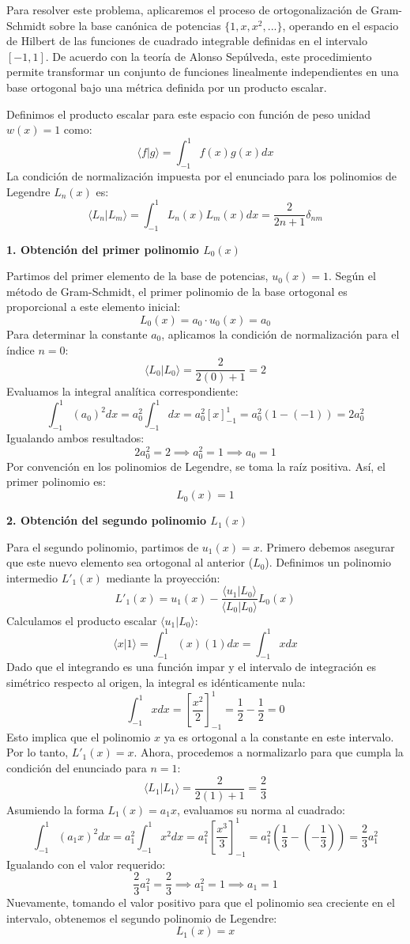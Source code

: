 \documentclass[a4paper]{article}
\begin{document}
Para resolver este problema, aplicaremos el proceso de ortogonalización de Gram-Schmidt sobre la base canónica de potencias $\{1, x, x^2, ...\}$, operando en el espacio de Hilbert de las funciones de cuadrado integrable definidas en el intervalo $[-1, 1]$. De acuerdo con la teoría de Alonso Sepúlveda, este procedimiento permite transformar un conjunto de funciones linealmente independientes en una base ortogonal bajo una métrica definida por un producto escalar.

Definimos el producto escalar para este espacio con función de peso unidad $w(x) = 1$ como:
$$ \langle f | g \rangle = \int_{-1}^{1} f(x)g(x) dx $$
La condición de normalización impuesta por el enunciado para los polinomios de Legendre $L_n(x)$ es:
$$ \langle L_n | L_m \rangle = \int_{-1}^{1} L_n(x)L_m(x) dx = \frac{2}{2n+1} \delta_{nm} $$

\textbf{1. Obtención del primer polinomio $L_0(x)$}

Partimos del primer elemento de la base de potencias, $u_0(x) = 1$. Según el método de Gram-Schmidt, el primer polinomio de la base ortogonal es proporcional a este elemento inicial:
$$ L_0(x) = a_0 \cdot u_0(x) = a_0 $$
Para determinar la constante $a_0$, aplicamos la condición de normalización para el índice $n=0$:
$$ \langle L_0 | L_0 \rangle = \frac{2}{2(0)+1} = 2 $$
Evaluamos la integral analítica correspondiente:
$$ \int_{-1}^{1} (a_0)^2 dx = a_0^2 \int_{-1}^{1} dx = a_0^2 [x]_{-1}^{1} = a_0^2 (1 - (-1)) = 2a_0^2 $$
Igualando ambos resultados:
$$ 2a_0^2 = 2 \implies a_0^2 = 1 \implies a_0 = 1 $$
Por convención en los polinomios de Legendre, se toma la raíz positiva. Así, el primer polinomio es:
$$ L_0(x) = 1 $$

\textbf{2. Obtención del segundo polinomio $L_1(x)$}

Para el segundo polinomio, partimos de $u_1(x) = x$. Primero debemos asegurar que este nuevo elemento sea ortogonal al anterior ($L_0$). Definimos un polinomio intermedio $L'_1(x)$ mediante la proyección:
$$ L'_1(x) = u_1(x) - \frac{\langle u_1 | L_0 \rangle}{\langle L_0 | L_0 \rangle} L_0(x) $$
Calculamos el producto escalar $\langle u_1 | L_0 \rangle$:
$$ \langle x | 1 \rangle = \int_{-1}^{1} (x)(1) dx = \int_{-1}^{1} x dx $$
Dado que el integrando es una función impar y el intervalo de integración es simétrico respecto al origen, la integral es idénticamente nula:
$$ \int_{-1}^{1} x dx = \left[ \frac{x^2}{2} \right]_{-1}^{1} = \frac{1}{2} - \frac{1}{2} = 0 $$
Esto implica que el polinomio $x$ ya es ortogonal a la constante en este intervalo. Por lo tanto, $L'_1(x) = x$. Ahora, procedemos a normalizarlo para que cumpla la condición del enunciado para $n=1$:
$$ \langle L_1 | L_1 \rangle = \frac{2}{2(1)+1} = \frac{2}{3} $$
Asumiendo la forma $L_1(x) = a_1 x$, evaluamos su norma al cuadrado:
$$ \int_{-1}^{1} (a_1 x)^2 dx = a_1^2 \int_{-1}^{1} x^2 dx = a_1^2 \left[ \frac{x^3}{3} \right]_{-1}^{1} = a_1^2 \left( \frac{1}{3} - \left(-\frac{1}{3}\right) \right) = \frac{2}{3} a_1^2 $$
Igualando con el valor requerido:
$$ \frac{2}{3} a_1^2 = \frac{2}{3} \implies a_1^2 = 1 \implies a_1 = 1 $$
Nuevamente, tomando el valor positivo para que el polinomio sea creciente en el intervalo, obtenemos el segundo polinomio de Legendre:
$$ L_1(x) = x $$
\end{document}
